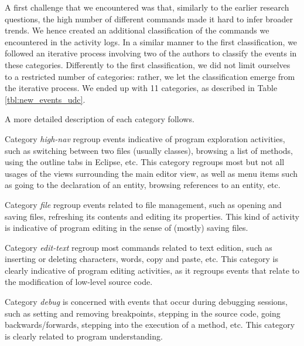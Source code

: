\documentclass[times]{smrauth}
\begin{document}
A first challenge that we encountered was that, similarly to the earlier research questions, the high number of different commands made it hard to infer broader trends. We hence created an additional classification of the commands we encountered in the activity logs. In a similar manner to the first classification, we followed an iterative process involving two of the authors to classify the events in these categories. Differently to the first classification, we did not limit ourselves to a restricted number of categories: rather, we let the classification emerge from the iterative process. We ended up with 11 categories, as described in Table \ref{tbl:new_events_udc}.


A more detailed description of each category follows.

Category \emph{high-nav} regroup events indicative of program exploration activities, such as switching between two files (usually classes), browsing a list of methods, using the outline tabs in Eclipse, etc. This category regroups most but not all usages of the views surrounding the main editor view, as well as menu items such as going to the declaration of an entity, browsing references to an entity, etc.

Category \emph{file} regroup events related to file management, such as opening and saving files, refreshing its contents and editing its properties. This kind of activity is indicative of program editing in the sense of (mostly) saving files.

Category \emph{edit-text} regroup most commands related to text edition, such as inserting or deleting characters, words, copy and paste, etc. This category is clearly indicative of program editing activities, as it regroups events that relate to the modification of low-level source code.

Category \emph{debug} is concerned with events that occur during debugging sessions, such as setting and removing breakpoints, stepping in the source code, going backwards/forwards, stepping into the execution of a method, etc. This category is clearly related to program understanding. 
\end{document}

